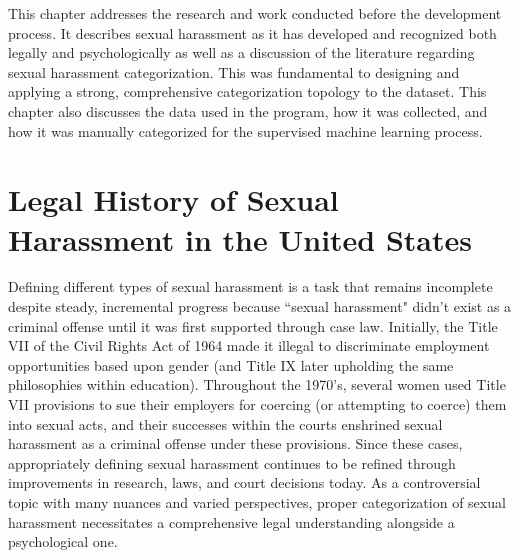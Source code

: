 This chapter addresses the research and work conducted before the development process. It describes sexual harassment as it has developed and recognized both legally and psychologically as well as a discussion of the literature regarding sexual harassment categorization. This was fundamental to designing and applying a strong, comprehensive categorization topology to the dataset. This chapter also discusses the data used in the program, how it was collected, and how it was manually categorized for the supervised machine learning process.

\section{Legal History of Sexual Harassment in the United States}

Defining different types of sexual harassment is a task that remains incomplete despite steady, incremental progress because ``sexual harassment" didn't exist as a criminal offense until it was first supported through case law. Initially, the Title VII of the Civil Rights Act of 1964 made it illegal to discriminate employment opportunities based upon gender (and Title IX later upholding the same philosophies within education). Throughout the 1970's, several women used Title VII provisions to sue their employers for coercing (or attempting to coerce) them into sexual acts, and their successes within the courts enshrined sexual harassment as a criminal offense under these provisions. Since these cases, appropriately defining sexual harassment continues to be refined through improvements in research, laws, and court decisions today. As a controversial topic with many nuances and varied perspectives, proper categorization of sexual harassment necessitates a comprehensive legal understanding alongside a psychological one.

